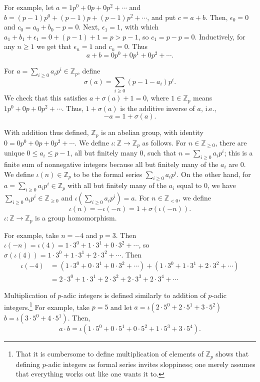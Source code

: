 \documentclass{article}
\theoremstyle{definition}
\theoremstyle{definition}
\begin{document}
For example, let $a=1p^0+0p+0p^2+\cdots$ and $b=(p-1)p^0+(p-1)p+(p-1)p^2+\cdots$, and put $c=a+b$.
Then, $\epsilon_0=0$ and $c_0=a_0+b_0-p=0$. Next, $\epsilon_1=1$, with which 
$a_1+b_1+\epsilon_1=0+(p-1)+1=p>p-1$, so $c_1=p-p=0$. Inductively,
for any $n \geq 1$ we get that $\epsilon_n=1$ and $c_n=0$. Thus
\[
a+b=0p^0+0p^1+0p^2+\cdots.
\]

For $a=\sum_{i \geq 0} a_ip^i \in \mathbb{Z}_p$, define
\[
\sigma(a) = \sum_{i \geq 0} (p-1-a_i) p^i.
\]
We check that this satisfies $a+\sigma(a)+1=0$, where $1 \in \mathbb{Z}_p$ means $1 p^0+0 p+0 p^2+\cdots$. Thus, $1+\sigma(a)$ is the additive inverse of $a$, i.e.,
\[
-a=1+\sigma(a).
\]

With addition thus defined, $\mathbb{Z}_p$ is an abelian group, with identity $0=0p^0+0p+0p^2+\cdots$.
We define $\iota:\mathbb{Z} \to \mathbb{Z}_p$ as follows. 
For 
$n \in \mathbb{Z}_{\geq 0}$, there are unique $0 \leq a_i \leq p-1$, all but finitely many $0$, such that 
$n = \sum_{i \geq 0} a_i p^i$; this is a finite sum of nonnegative integers because all but finitely many of the $a_i$ are 0.
We define $\iota(n) \in \mathbb{Z}_p$ to be the formal series  $\sum_{i \geq 0} a_i p^i$. 
On the other
hand, for $a = \sum_{i \geq 0} a_i p^i \in \mathbb{Z}_p$ with all but finitely many of the $a_i$ equal to $0$, 
we have $ \sum_{i \geq 0} a_i p^i  \in \mathbb{Z}_{\geq 0}$ and $\iota( \sum_{i \geq 0} a_i p^i ) = a$. 
For $n \in \mathbb{Z}_{<0}$, we define
\[
\iota(n) =  -\iota(-n) = 1+\sigma(\iota(-n)).
\]
$\iota:\mathbb{Z} \to \mathbb{Z}_p$ is a group homomorphism.

For example, take $n=-4$ and $p=3$. Then $\iota(-n)=\iota(4)=1 \cdot 3^0+1 \cdot 3^1 + 0 \cdot 3^2 + \cdots$, so
$\sigma(\iota(4))=1 \cdot 3^0+1 \cdot 3^1+2\cdot 3^2+\cdots$. Then
\begin{align*}
\iota(-4)&=(1\cdot 3^0+0\cdot 3^1+0\cdot 3^2+\cdots)+(1\cdot 3^0+1\cdot 3^1+2\cdot 3^2+\cdots)\\
&=2\cdot 3^0+1\cdot 3^1+2\cdot 3^2+2\cdot 3^3+2\cdot 3^4+\cdots
\end{align*}

Multiplication of $p$-adic integers is defined similarly to addition of $p$-adic integers.\footnote{That it is cumbersome to
define multiplication of elements of $\mathbb{Z}_p$ shows that defining $p$-adic integers as formal series invites sloppiness;
one merely assumes that everything works out like one wants it to.}
For example, take $p=5$ and let $a=\iota(2\cdot 5^0+2\cdot 5^1+3\cdot 5^2)$
$b=\iota(3\cdot 5^0+4\cdot 5^1)$. Then,
\[
a\cdot b=\iota(1\cdot 5^0+0\cdot 5^1+0\cdot 5^2+1\cdot 5^3+3\cdot 5^4).
\]
\end{document}
